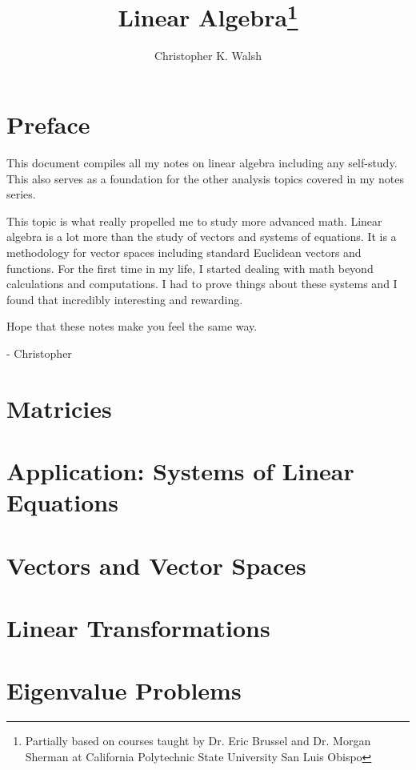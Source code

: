 \documentclass[12pt,openany]{book}
\title{Linear Algebra\thanks{Partially based on courses taught by Dr. Eric Brussel and Dr. Morgan Sherman at California Polytechnic State University San Luis Obispo}}
\author{Christopher K. Walsh}
\theoremstyle{mydefinitionstyle}
\theoremstyle{myexamplestyle}
\theoremstyle{remark}
\begin{document}
\maketitle
\tableofcontents

\newpage
\chapter*{Preface}
This document compiles all my notes on linear algebra including any self-study.
This also serves as a foundation for the other analysis topics covered in my notes series.

This topic is what really propelled me to study more advanced math. Linear algebra is a lot more than the study of
vectors and systems of equations. It is a methodology for vector spaces including standard Euclidean vectors and functions.
For the first time in my life, I started dealing with math beyond calculations and computations. I had to prove things
about these systems and I found that incredibly interesting and rewarding.

Hope that these notes make you feel the same way.

- Christopher


\chapter{Matricies}


\chapter{Application: Systems of Linear Equations}


\chapter{Vectors and Vector Spaces}


\chapter{Linear Transformations}


\chapter{Eigenvalue Problems}

\end{document}
